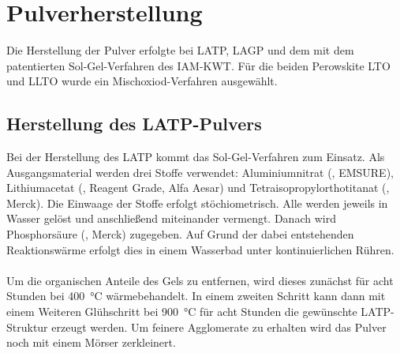 \documentclass[a4paper, 11pt, headsepline,footsepline,twoside,abstract]{scrbook}
\begin{document}
\section{Pulverherstellung}
Die Herstellung der Pulver erfolgte bei LATP, LAGP und dem  mit dem patentierten Sol-Gel-Verfahren des IAM-KWT. Für die beiden Perowskite LTO und LLTO wurde ein Mischoxiod-Verfahren ausgewählt.
\subsection{Herstellung des LATP-Pulvers}
\label{praep_LATP}
Bei der Herstellung des LATP kommt das Sol-Gel-Verfahren zum Einsatz. Als Ausgangsmaterial werden drei Stoffe verwendet: Aluminiumnitrat (, EMSURE), Lithiumacetat (, Reagent Grade, Alfa Aesar) und Tetra\-iso\-propyl\-ortho\-titanat (, Merck). Die Einwaage der Stoffe erfolgt stöchiometrisch. Alle werden jeweils in Wasser gelöst und anschließend miteinander vermengt. Danach wird Phosphorsäure (, Merck) zugegeben. Auf Grund der dabei entstehenden Reaktionswärme erfolgt dies in einem Wasserbad unter kontinuierlichen Rühren.
\\\\
Um die organischen Anteile des Gels zu entfernen, wird dieses zunächst für acht Stunden bei \SI{400}{\celsius} wärmebehandelt. In einem zweiten Schritt kann dann mit einem Weiteren Glühschritt bei \SI{900}{\celsius} für acht Stunden die gewünschte LATP-Struktur erzeugt werden. Um feinere Agglomerate zu erhalten wird das Pulver noch mit einem Mörser zerkleinert.
\end{document}
